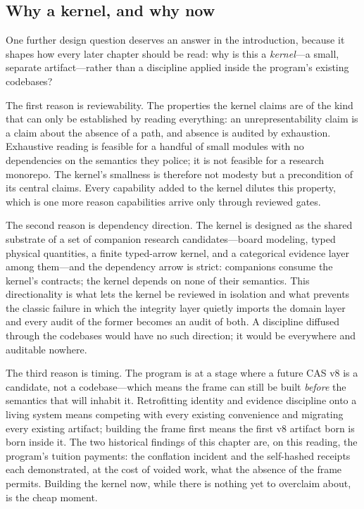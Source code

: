 \subsection{Why a kernel, and why now}\label{ch01:whykernel}

One further design question deserves an answer in the introduction,
because it shapes how every later chapter should be read: why is this a
\emph{kernel}---a small, separate artifact---rather than a discipline
applied inside the program's existing codebases?

The first reason is reviewability. The properties the kernel claims are
of the kind that can only be established by reading everything: an
unrepresentability claim is a claim about the absence of a path, and
absence is audited by exhaustion. Exhaustive reading is feasible for a
handful of small modules with no dependencies on the semantics they
police; it is not feasible for a research monorepo. The kernel's
smallness is therefore not modesty but a precondition of its central
claims. Every capability added to the kernel dilutes this property,
which is one more reason capabilities arrive only through reviewed
gates.

The second reason is dependency direction. The kernel is designed as
the shared substrate of a set of companion research candidates---board
modeling, typed physical quantities, a finite typed-arrow kernel, and a
categorical evidence layer among them---and the dependency arrow is
strict: companions consume the kernel's contracts; the kernel depends
on none of their semantics. This directionality is what lets the kernel
be reviewed in isolation and what prevents the classic failure in which
the integrity layer quietly imports the domain layer and every audit of
the former becomes an audit of both. A discipline diffused through the
codebases would have no such direction; it would be everywhere and
auditable nowhere.

The third reason is timing. The program is at a stage where a future
CAS v8 is a candidate, not a codebase---which means the frame can still
be built \emph{before} the semantics that will inhabit it. Retrofitting
identity and evidence discipline onto a living system means competing
with every existing convenience and migrating every existing artifact;
building the frame first means the first v8 artifact born is born
inside it. The two historical findings of this chapter are, on this
reading, the program's tuition payments: the conflation incident and
the self-hashed receipts each demonstrated, at the cost of voided work,
what the absence of the frame permits. Building the kernel now, while
there is nothing yet to overclaim about, is the cheap moment.

